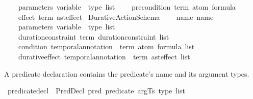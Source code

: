 \begin{isabellebody}
\ \ \ \ {\isacharparenleft}{\kern0pt}parameters{\isacharcolon}{\kern0pt}\ {\isachardoublequoteopen}{\isacharparenleft}{\kern0pt}variable\ {\isasymtimes}\ type{\isacharparenright}{\kern0pt}\ list{\isachardoublequoteclose}{\isacharparenright}{\kern0pt}\isanewline
\ \ \ \ {\isacharparenleft}{\kern0pt}precondition{\isacharcolon}{\kern0pt}\ {\isachardoublequoteopen}term\ atom\ formula{\isachardoublequoteclose}{\isacharparenright}{\kern0pt}\isanewline
\ \ \ \ {\isacharparenleft}{\kern0pt}effect{\isacharcolon}{\kern0pt}\ {\isachardoublequoteopen}term\ ast{\isacharunderscore}{\kern0pt}effect{\isachardoublequoteclose}{\isacharparenright}{\kern0pt}\isanewline
{\isacharbar}{\kern0pt}\ Durative{\isacharunderscore}{\kern0pt}Action{\isacharunderscore}{\kern0pt}Schema\isanewline
\ \ \ \ {\isacharparenleft}{\kern0pt}name{\isacharcolon}{\kern0pt}\ name{\isacharparenright}{\kern0pt}\isanewline
\ \ \ \ {\isacharparenleft}{\kern0pt}parameters{\isacharcolon}{\kern0pt}\ {\isachardoublequoteopen}{\isacharparenleft}{\kern0pt}variable\ {\isasymtimes}\ type{\isacharparenright}{\kern0pt}\ list{\isachardoublequoteclose}{\isacharparenright}{\kern0pt}\ \ \ \ \ \ \ \ \ \ \ \ \ \ \ \ \ \ \ \ \ \ \ \ \ \ \ \ \ \isanewline
\ \ \ \ {\isacharparenleft}{\kern0pt}duration{\isacharunderscore}{\kern0pt}constraint{\isacharcolon}{\kern0pt}\ {\isachardoublequoteopen}term\ duration{\isacharunderscore}{\kern0pt}constraint\ list{\isachardoublequoteclose}{\isacharparenright}{\kern0pt}\isanewline
\ \ \ \ {\isacharparenleft}{\kern0pt}condition{\isacharcolon}{\kern0pt}\ {\isachardoublequoteopen}{\isacharparenleft}{\kern0pt}temporal{\isacharunderscore}{\kern0pt}annotation\ {\isasymtimes}\ {\isacharparenleft}{\kern0pt}term\ atom\ formula{\isacharparenright}{\kern0pt}{\isacharparenright}{\kern0pt}\ list{\isachardoublequoteclose}{\isacharparenright}{\kern0pt}\isanewline
\ \ \ \ {\isacharparenleft}{\kern0pt}durative{\isacharunderscore}{\kern0pt}effect{\isacharcolon}{\kern0pt}\ {\isachardoublequoteopen}{\isacharparenleft}{\kern0pt}temporal{\isacharunderscore}{\kern0pt}annotation\ {\isasymtimes}\ {\isacharparenleft}{\kern0pt}term\ ast{\isacharunderscore}{\kern0pt}effect{\isacharparenright}{\kern0pt}{\isacharparenright}{\kern0pt}\ list{\isachardoublequoteclose}{\isacharparenright}{\kern0pt}%
\begin{isamarkuptext}%
A predicate declaration contains the predicate's name and its
  argument types.%
\end{isamarkuptext}\isamarkuptrue%
\isamarkupfalse%
\ predicate{\isacharunderscore}{\kern0pt}decl\ {\isacharequal}{\kern0pt}\ PredDecl\ {\isacharparenleft}{\kern0pt}pred{\isacharcolon}{\kern0pt}\ predicate{\isacharparenright}{\kern0pt}\ {\isacharparenleft}{\kern0pt}argTs{\isacharcolon}{\kern0pt}\ {\isachardoublequoteopen}type\ list{\isachardoublequoteclose}{\isacharparenright}{\kern0pt}\isanewline

\end{isabellebody}

